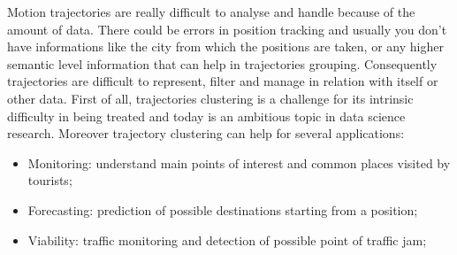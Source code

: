 Motion trajectories are really difficult to analyse and handle because of the amount of data. There could be errors in position tracking and usually you don't have informations like the city from which the positions are taken, or any higher semantic level information that can help in trajectories grouping. Consequently trajectories are difficult to represent, filter and manage in relation with itself or other data. First of all, trajectories clustering is a challenge for its intrinsic difficulty in being treated and today is an ambitious topic in data science research. Moreover trajectory clustering can help for several applications:
\begin{itemize}
	\item Monitoring: understand main points of interest and common places visited by tourists;
	\item Forecasting: prediction of possible destinations starting from a position; 
	\item Viability: traffic monitoring and detection of possible point of traffic jam;
\end{itemize}
